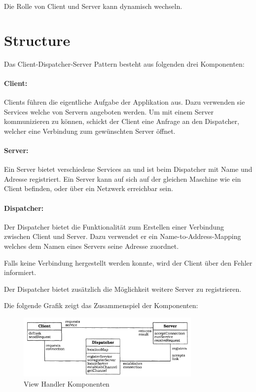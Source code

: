 Die Rolle von Client und Server kann dynamisch wechseln.

\section{Structure}
Das Client-Dispatcher-Server Pattern besteht aus folgenden drei Komponenten:
\paragraph{Client:} Clients führen die eigentliche Aufgabe der Applikation aus. Dazu verwenden sie Services welche von Servern angeboten werden. Um mit einem Server kommunizieren zu können, schickt der Client eine Anfrage an den Dispatcher, welcher eine Verbindung zum gewünschten Server öffnet.

\paragraph{Server:} Ein Server bietet verschiedene Services an und ist beim Dispatcher mit Name und Adresse registriert. Ein Server kann auf sich auf der gleichen Maschine wie ein Client befinden, oder über ein Netzwerk erreichbar sein.

\paragraph{Dispatcher:} Der Dispatcher bietet die Funktionalität zum Erstellen einer Verbindung zwischen Client und Server. Dazu verwendet er ein Name-to-Address-Mapping welches dem Namen eines Servers seine Adresse zuordnet.

Falls keine Verbindung hergestellt werden konnte, wird der Client über den Fehler informiert.

Der Dispatcher bietet zusätzlich die Möglichkeit weitere Server zu registrieren.

\medskip
Die folgende Grafik zeigt das Zusammenspiel der Komponenten:
\begin{figure}[H]
	\centering
	\includegraphics[width=0.8\textwidth]{figures/12-client-dispatcher-server-1.png}
	\caption{View Handler Komponenten}
\end{figure}

